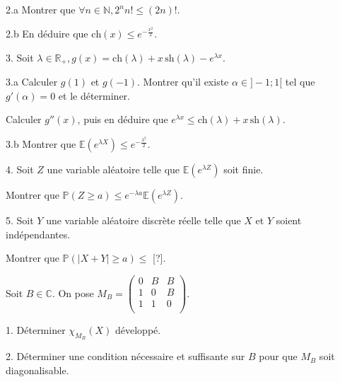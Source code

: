 \vspace{5pt}
2.a Montrer que $\forall n \in \mathbb{N}, 2^n n! \leqslant (2n)!$.

\vspace{5pt}
2.b En déduire que $\mathrm{ch}(x) \leqslant e^{-\frac {x^2} {2}}$.

\vspace{5pt}
3. Soit $\lambda \in \mathbb{R}_+, g(x) = \mathrm{ch}(\lambda) + x \, \mathrm{sh}(\lambda) - e^{\lambda x}$.

\vspace{5pt}
\quad 3.a Calculer $g(1)$ et $g(-1)$. Montrer qu'il existe $\alpha \in \rbrack -1;1 \lbrack$
tel que $g'(\alpha) = 0$ et le déterminer.

\quad Calculer $g''(x)$, puis en déduire que $e^{\lambda x} \leqslant \mathrm{ch}(\lambda) + x \, \mathrm{sh}(\lambda)$.

\vspace{5pt}
\quad 3.b Montrer que $\mathbb{E}\left(e^{\lambda X}\right) \leqslant e^{- \frac {\lambda^2} {2}}$.

\vspace{5pt}
4. Soit $Z$ une variable aléatoire telle que $\mathbb{E}\left(e^{\lambda Z}\right)$ soit finie.

Montrer que $\mathbb{P}\left(Z \geqslant a\right) \leqslant e^{-\lambda a} \mathbb{E}\left(e^{\lambda Z}\right)$.

\vspace{5pt}
5. Soit $Y$ une variable aléatoire discrète réelle telle que $X$ et $Y$ soient indépendantes.

Montrer que $\mathbb{P}(| X + Y| \geqslant a) \leqslant$ [?].



\subetoiles



\noindent Soit $B \in \mathbb{C}$. On pose $M_B = 
\begin{pmatrix}
  0 & B & B \\
  1 & 0 & B \\
  1 & 1 & 0 \\
\end{pmatrix}$.

\vspace{5pt}
1. Déterminer $\chi_{M_B}(X)$ développé.

\vspace{5pt}
2. Déterminer une condition nécessaire et suffisante sur $B$ pour que $M_B$ soit \\ diagonalisable.



